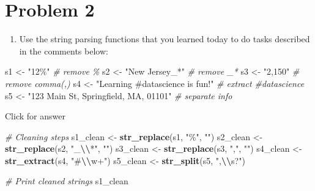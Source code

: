 \documentclass[
]{book}
\newenvironment{Shaded}{\begin{snugshade}}{\end{snugshade}}
\newcommand{\CommentTok}[1]{\textcolor[rgb]{0.56,0.35,0.01}{\textit{#1}}}
\newcommand{\FunctionTok}[1]{\textcolor[rgb]{0.13,0.29,0.53}{\textbf{#1}}}
\newcommand{\NormalTok}[1]{#1}
\newcommand{\OtherTok}[1]{\textcolor[rgb]{0.56,0.35,0.01}{#1}}
\newcommand{\SpecialCharTok}[1]{\textcolor[rgb]{0.81,0.36,0.00}{\textbf{#1}}}
\newcommand{\StringTok}[1]{\textcolor[rgb]{0.31,0.60,0.02}{#1}}
\providecommand{\tightlist}{%
  \setlength{\itemsep}{0pt}\setlength{\parskip}{0pt}}
\begin{document}
\hypertarget{problem-2}{%
\section{Problem 2}\label{problem-2}}

\begin{enumerate}
\def\labelenumi{\alph{enumi}.}
\tightlist
\item
  Use the string parsing functions that you learned today to do tasks described in the comments below:
\end{enumerate}

\begin{Shaded}
\begin{Highlighting}[]
\NormalTok{s1 }\OtherTok{\textless{}{-}} \StringTok{"12\%"}  \CommentTok{\# remove \%}
\NormalTok{s2 }\OtherTok{\textless{}{-}} \StringTok{"New Jersey\_*"}  \CommentTok{\# remove \_*}
\NormalTok{s3 }\OtherTok{\textless{}{-}} \StringTok{"2,150"}    \CommentTok{\# remove comma(,)}
\NormalTok{s4 }\OtherTok{\textless{}{-}} \StringTok{"Learning \#datascience is fun!"}   \CommentTok{\# extract \#datascience}
\NormalTok{s5 }\OtherTok{\textless{}{-}} \StringTok{"123 Main St, Springfield, MA, 01101"}   \CommentTok{\# separate info}
\end{Highlighting}
\end{Shaded}

Click for answer

\begin{Shaded}
\begin{Highlighting}[]
\CommentTok{\# Cleaning steps}
\NormalTok{s1\_clean }\OtherTok{\textless{}{-}} \FunctionTok{str\_replace}\NormalTok{(s1, }\StringTok{"\%"}\NormalTok{, }\StringTok{""}\NormalTok{)}
\NormalTok{s2\_clean }\OtherTok{\textless{}{-}} \FunctionTok{str\_replace}\NormalTok{(s2, }\StringTok{"\_}\SpecialCharTok{\textbackslash{}\textbackslash{}}\StringTok{*"}\NormalTok{, }\StringTok{""}\NormalTok{)}
\NormalTok{s3\_clean }\OtherTok{\textless{}{-}} \FunctionTok{str\_replace}\NormalTok{(s3, }\StringTok{","}\NormalTok{, }\StringTok{""}\NormalTok{)}
\NormalTok{s4\_clean }\OtherTok{\textless{}{-}} \FunctionTok{str\_extract}\NormalTok{(s4, }\StringTok{"\#}\SpecialCharTok{\textbackslash{}\textbackslash{}}\StringTok{w+"}\NormalTok{)}
\NormalTok{s5\_clean }\OtherTok{\textless{}{-}} \FunctionTok{str\_split}\NormalTok{(s5, }\StringTok{",}\SpecialCharTok{\textbackslash{}\textbackslash{}}\StringTok{s?"}\NormalTok{)}

\CommentTok{\# Print cleaned strings}
\NormalTok{s1\_clean}
\end{Highlighting}
\end{Shaded}
\end{document}
